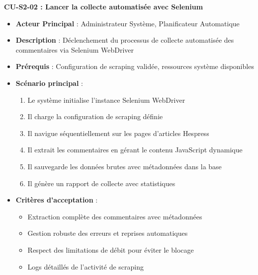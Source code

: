 \textbf{CU-S2-02 : Lancer la collecte automatisée avec Selenium}
\begin{itemize}
    \item \textbf{Acteur Principal} : Administrateur Système, Planificateur Automatique
    \item \textbf{Description} : Déclenchement du processus de collecte automatisée des commentaires via Selenium WebDriver
    \item \textbf{Prérequis} : Configuration de scraping validée, ressources système disponibles
    \item \textbf{Scénario principal} :
    \begin{enumerate}
        \item Le système initialise l'instance Selenium WebDriver
        \item Il charge la configuration de scraping définie
        \item Il navigue séquentiellement sur les pages d'articles Hespress
        \item Il extrait les commentaires en gérant le contenu JavaScript dynamique
        \item Il sauvegarde les données brutes avec métadonnées dans la base
        \item Il génère un rapport de collecte avec statistiques
    \end{enumerate}
    \item \textbf{Critères d'acceptation} :
    \begin{itemize}
        \item Extraction complète des commentaires avec métadonnées
        \item Gestion robuste des erreurs et reprises automatiques
        \item Respect des limitations de débit pour éviter le blocage
        \item Logs détaillés de l'activité de scraping
    \end{itemize}
\end{itemize}

